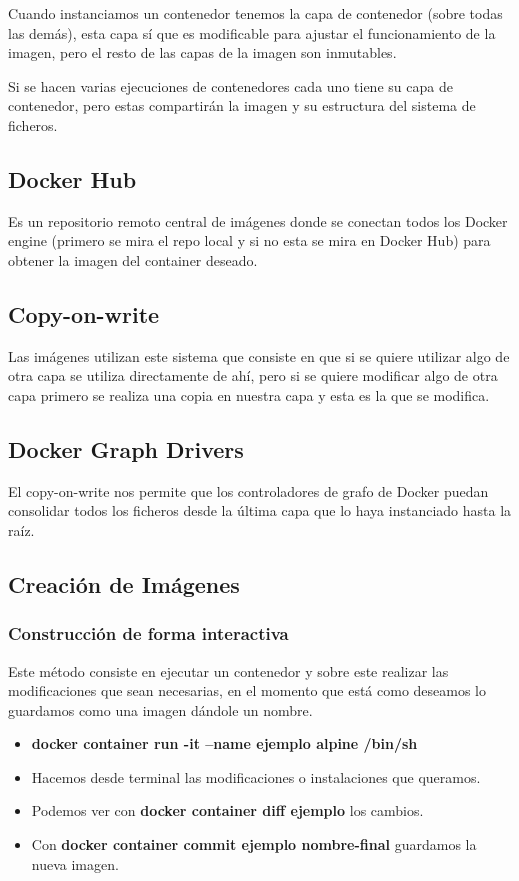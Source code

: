 \documentclass[12pt, twoside, openright]{report} %
\begin{document}
Cuando instanciamos un contenedor tenemos la capa de contenedor (sobre todas las demás), esta capa sí que es modificable para ajustar el funcionamiento de la imagen, pero el resto de las capas de la imagen son inmutables.

Si se hacen varias ejecuciones de contenedores cada uno tiene su capa de contenedor, pero estas compartirán la imagen y su estructura del sistema de ficheros.

\subsection{Docker Hub}
Es un repositorio remoto central de imágenes donde se conectan todos los Docker engine (primero se mira el repo local y si no esta se mira en Docker Hub) para obtener la imagen del container deseado.

\subsection{Copy-on-write}
Las imágenes utilizan este sistema que consiste en que si se quiere utilizar algo de otra capa se utiliza directamente de ahí, pero si se quiere modificar algo de otra capa primero se realiza una copia en nuestra capa y esta es la que se modifica.

\subsection{Docker Graph Drivers}
El copy-on-write nos permite que los controladores de grafo de Docker puedan consolidar todos los ficheros desde la última capa que lo haya instanciado hasta la raíz.

\subsection{Creación de Imágenes}
\subsubsection{Construcción de forma interactiva}
Este método consiste en ejecutar un contenedor y sobre este realizar las modificaciones que sean necesarias, en el momento que está como deseamos lo guardamos como una imagen dándole un nombre.
\begin{itemize}
	\item \textbf{docker container run -it --name ejemplo alpine /bin/sh}
	\item Hacemos desde terminal las modificaciones o instalaciones que queramos.
	\item Podemos ver con \textbf{docker container diff ejemplo} los cambios.
	\item Con \textbf{docker container commit ejemplo nombre-final} guardamos la nueva imagen.
\end{itemize}
\end{document}
